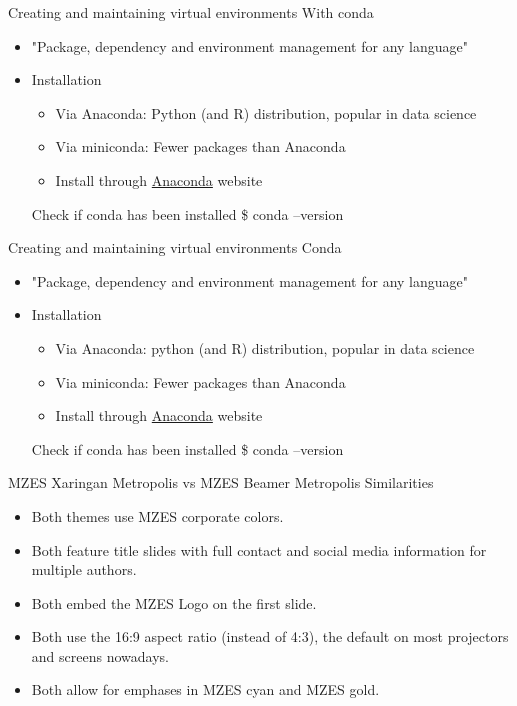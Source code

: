 \documentclass[10pt, aspectratio=169]{beamer}
\newcommand{\cemph}[1]{\textcolor{mzescyan}{#1}}
\newcommand{\gemph}[1]{\textcolor{mzesgold}{#1}}
\begin{document}
{       	\begin{frame}{Creating and maintaining virtual environments}
\small          
 With \gemph{conda}
\begin{itemize}
    \item "Package, dependency and environment management for any language"
    \item Installation
    \begin{itemize}
        \item Via \cemph{Anaconda}: Python (and R) distribution, popular in data science
        \item Via \cemph{miniconda}: Fewer packages than Anaconda
        \item Install through \href{https://www.anaconda.com}{Anaconda} website
    \end{itemize}
    \begin{block}{Check if conda has been installed}
                   \$ conda --version
		          \end{block} 
\end{itemize}
  \end{frame}

       	\begin{frame}{Creating and maintaining virtual environments}
\small          
 \gemph{Conda}
\begin{itemize}
    \item "Package, dependency and environment management for any language"
    \item Installation
    \begin{itemize}
        \item Via \cemph{Anaconda}: python (and R) distribution, popular in data science
        \item Via \cemph{miniconda}: Fewer packages than Anaconda
        \item Install through \href{https://www.anaconda.com}{Anaconda} website
    \end{itemize}
    \begin{block}{Check if conda has been installed}
                   \$ conda --version
		          \end{block} 
\end{itemize}


  \end{frame}
 
	\begin{frame}{MZES Xaringan Metropolis vs MZES Beamer Metropolis}
	\small
	\cemph{Similarities}
		\begin{itemize}
			\item Both themes use MZES corporate colors.
			\item Both feature title slides with full contact and social media information for multiple authors.
			\item Both embed the MZES Logo on the first slide.
			\item Both use the 16:9 aspect ratio (instead of 4:3), the default on most projectors and screens nowadays.
			\item Both allow for emphases in \cemph{MZES cyan} and \gemph{MZES gold}.
		\end{itemize}
	\end{frame}

}
\end{document}

